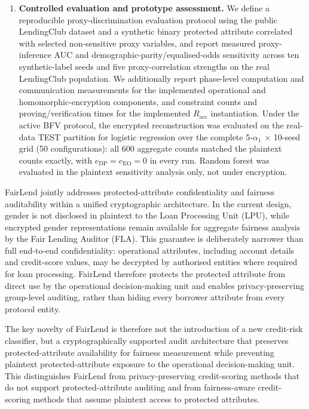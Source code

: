 \documentclass[a4paper,fleqn]{cas-dc}
\begin{document}
\begin{enumerate}
    \item \textbf{Controlled evaluation and prototype assessment.} We define a reproducible proxy-discrimination evaluation protocol using the public LendingClub dataset and a synthetic binary protected attribute correlated with selected non-sensitive proxy variables, and report measured proxy-inference AUC and demographic-parity/equalised-odds sensitivity across ten synthetic-label seeds and five proxy-correlation strengths on the real LendingClub population. We additionally report phase-level computation and communication measurements for the implemented operational and homomorphic-encryption components, and constraint counts and proving/verification times for the implemented $R_{\mathrm{acc}}$ instantiation. Under the active BFV protocol, the encrypted reconstruction was evaluated on the real-data TEST partition for logistic regression over the complete 5-$\alpha_1$ $\times$ 10-seed grid (50 configurations): all 600 aggregate counts matched the plaintext counts exactly, with $e_{\mathrm{DP}}=e_{\mathrm{EO}}=0$ in every run. Random forest was evaluated in the plaintext sensitivity analysis only, not under encryption.
\end{enumerate}

FairLend jointly addresses protected-attribute confidentiality and fairness auditability within a unified cryptographic architecture. In the current design, gender is not disclosed in plaintext to the Loan Processing Unit (LPU), while encrypted gender representations remain available for aggregate fairness analysis by the Fair Lending Auditor (FLA). This guarantee is deliberately narrower than full end-to-end confidentiality: operational attributes, including account details and credit-score values, may be decrypted by authorised entities where required for loan processing. FairLend therefore protects the protected attribute from direct use by the operational decision-making unit and enables privacy-preserving group-level auditing, rather than hiding every borrower attribute from every protocol entity.

\color{black}


The key novelty of FairLend is therefore not the introduction of a new credit-risk classifier, but a cryptographically supported audit architecture that preserves protected-attribute availability for fairness measurement while preventing plaintext protected-attribute exposure to the operational decision-making unit. This distinguishes FairLend from privacy-preserving credit-scoring methods that do not support protected-attribute auditing and from fairness-aware credit-scoring methods that assume plaintext access to protected attributes.
\end{document}
